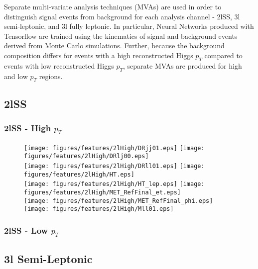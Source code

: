 Separate multi-variate analysis techniques (MVAs) are used in order to distinguish signal events from background for each analysis channel - 2lSS, 3l semi-leptonic, and 3l fully leptonic. In particular, Neural Networks produced with Tensorflow are trained using the kinematics of signal and background events derived from Monte Carlo simulations. Further, because the background composition differs for events with a high reconstructed Higgs $p_T$ compared to events with low reconstructed Higgs $p_T$, separate MVAs are produced for high and low $p_T$ regions. 

\subsection{2lSS}
\label{sec:2lSigBkg}

\subsubsection{2lSS - High $p_T$}
\label{sec:2lHigh}

\begin{figure}[!htbp]
\centering
\texttt{[image: figures/features/2lHigh/DRjj01.eps]}%
\texttt{[image: figures/features/2lHigh/DRlj00.eps]}\\
\texttt{[image: figures/features/2lHigh/DRll01.eps]}%
\texttt{[image: figures/features/2lHigh/HT.eps]}\\
\texttt{[image: figures/features/2lHigh/HT\_lep.eps]}%
\texttt{[image: figures/features/2lHigh/MET\_RefFinal\_et.eps]}\\
\texttt{[image: figures/features/2lHigh/MET\_RefFinal\_phi.eps]}%
\texttt{[image: figures/features/2lHigh/Mll01.eps]}\\
\caption{}
\label{fig:}
\end{figure}

\subsubsection{2lSS - Low $p_T$}
\label{sec:2lLow}

\subsection{3l Semi-Leptonic}
\label{sec:3lSSigBkg}

